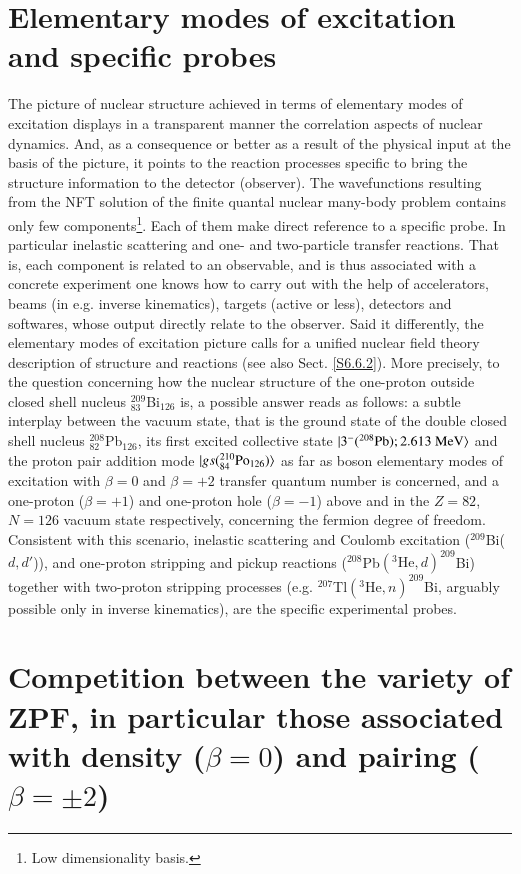 \section{Elementary modes of excitation and specific probes}
The picture of nuclear structure achieved in terms of elementary modes of excitation displays in a transparent manner the correlation aspects of nuclear dynamics. And, as a consequence or better as a result of the physical input at the basis of the picture, it points to the reaction processes specific to bring the structure information to the detector (observer). The wavefunctions resulting from the NFT solution of the finite quantal nuclear many-body problem contains only few components\footnote{Low dimensionality basis.}. Each of them make direct reference to a specific probe. In particular inelastic scattering and one- and two-particle transfer reactions. That is, each component is related to an observable, and is thus associated with a concrete experiment one knows how to carry out with the help of accelerators, beams (in e.g. inverse kinematics), targets (active or less), detectors and softwares, whose output directly relate to the observer. Said it differently, the elementary modes of excitation picture calls for a unified nuclear field theory description of structure and reactions (see also Sect. \ref{S6.6.2}). More precisely, to the question concerning how the nuclear structure of the one-proton outside closed shell nucleus $^{209}_{83}$Bi$_{126}$ is, a possible answer reads as follows: a subtle interplay between the vacuum state, that is the ground state of the double closed shell nucleus $^{208}_{82}$Pb$_{126}$, its first excited collective state $|{3^-(^{208}\text{Pb});2.613\text{ MeV}} \rangle$ and the proton pair addition mode $|{gs(^{210}_{84}\text{Po}_{126})} \rangle$ as far as boson elementary modes of excitation with $\beta=0$ and $\beta=+2$ transfer quantum number is concerned, and a one-proton ($\beta=+1$) and one-proton hole ($\beta=-1$) above and in the $Z=82$, $N=126$ vacuum state respectively, concerning the fermion degree of freedom. Consistent with this scenario, inelastic scattering and Coulomb excitation ($^{209}$Bi($d,d'$)),  and one-proton stripping and pickup reactions ($^{208}$Pb$(^3\text{He},d)^{209}$Bi) together with two-proton stripping processes (e.g. $^{207}$Tl$(^3\text{He},n)^{209}$Bi, arguably possible only in inverse kinematics), are the specific experimental probes.
\section[Competition between ZPF]{Competition between the variety of ZPF, in particular those associated with density ($\beta=0$) and pairing ($\beta=\pm2$)}\label{appintroF}

